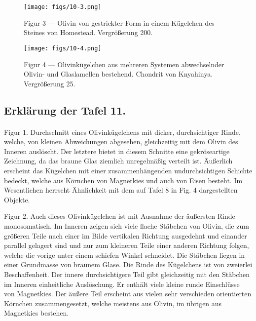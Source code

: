 \documentclass[a4paper, 11pt, oneside, polutonikogreek, german]{article}
\begin{document}
\vspace*{\fill}
\begin{figure}[H]
\centering
\texttt{[image: figs/10-3.png]}
\caption{\small Figur 3 --- Olivin von gestrickter Form in einem Kügelchen des Steines von Homestead. Vergrößerung 200.}
\end{figure}
\vspace*{\fill}
\clearpage

\vspace*{\fill}
\begin{figure}[H]
\centering
\texttt{[image: figs/10-4.png]}
\caption{\small Figur 4 --- Olivinkügelchen aus mehreren Systemen abwechselnder Olivin- und Glaslamellen bestehend. Chondrit von Knyahinya. Vergrößerung 25.}
\end{figure}
\vspace*{\fill}
\clearpage

\subsection{Erklärung der Tafel 11.}
\paragraph{}
Figur 1. Durchschnitt eines Olivinkügelchens mit dicker, durchsichtiger Rinde, welche, von kleinen Abweichungen abgesehen, gleichzeitig mit dem Olivin des Inneren auslöscht. Der letztere bietet in diesem Schnitte eine gekröseartige Zeichnung, da das braune Glas ziemlich unregelmäßig verteilt ist. Äußerlich erscheint das Kügelchen mit einer zusammenhängenden undurchsichtigen Schichte bedeckt, welche aus Körnchen von Magnetkies und auch von Eisen besteht. Im Wesentlichen herrscht Ähnlichkeit mit dem auf Tafel 8 in Fig. 4 dargestellten Objekte.

Figur 2. Auch dieses Olivinkügelchen ist mit Ausnahme der äußersten Rinde monosomatisch. Im Inneren zeigen sich viele flache Stäbchen von Olivin, die zum größeren Teile nach einer im Bilde vertikalen Richtung ausgedehnt und einander parallel gelagert sind und nur zum kleineren Teile einer anderen Richtung folgen, welche die vorige unter einem schiefen Winkel schneidet. Die Stäbchen liegen in einer Grundmasse von braunem Glase. Die Rinde des Kügelchens ist von zweierlei Beschaffenheit. Der innere durchsichtigere Teil gibt gleichzeitig mit den Stäbchen im Inneren einheitliche Auslöschung. Er enthält viele kleine runde Einschlüsse von Magnetkies. Der äußere Teil erscheint aus vielen sehr verschieden orientierten Körnchen zusammengesetzt, welche meistens aus Olivin, im übrigen aus Magnetkies bestehen.
\end{document}
